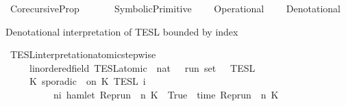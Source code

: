 %
\begin{isabellebody}%
%
%
\isadelimdocument
%
\endisadelimdocument
%
\isatagdocument
%
\isamarkuptrue%
%
\endisatagdocument
{\isafolddocument}%
%
\isadelimdocument
%
\endisadelimdocument
%
\isadelimtheory
%
\endisadelimtheory
%
\isatagtheory
{}\isamarkupfalse%
\ Corecursive{\isacharunderscore}Prop\isanewline
\ \ \isanewline
\ \ \ \ SymbolicPrimitive\isanewline
\ \ \ \ Operational\isanewline
\ \ \ \ Denotational\isanewline
\isanewline
{}%
\endisatagtheory
{\isafoldtheory}%
%
\isadelimtheory
%
\endisadelimtheory
%
\isadelimdocument
%
\endisadelimdocument
%
\isatagdocument
%
\isamarkuptrue%
%
\endisatagdocument
{\isafolddocument}%
%
\isadelimdocument
%
\endisadelimdocument
%
\begin{isamarkuptext}%
Denotational interpretation of TESL bounded by index%
\end{isamarkuptext}\isamarkuptrue%
\isamarkupfalse%
\ TESL{\isacharunderscore}interpretation{\isacharunderscore}atomic{\isacharunderscore}stepwise\isanewline
\ \ \ \ {\isacharcolon}{\isacharcolon}\ {\isacartoucheopen}{\isacharparenleft}{\isacharprime}{\isasymtau}{\isacharcolon}{\isacharcolon}linordered{\isacharunderscore}field{\isacharparenright}\ TESL{\isacharunderscore}atomic\ {\isasymRightarrow}\ nat\ {\isasymRightarrow}\ {\isacharprime}{\isasymtau}\ run\ set{\isacartoucheclose}\ {\isacharparenleft}{\isachardoublequoteopen}{\isasymlbrakk}\ {\isacharunderscore}\ {\isasymrbrakk}\isactrlsub T\isactrlsub E\isactrlsub S\isactrlsub L\isactrlbsup {\isasymge}\ {\isacharunderscore}\isactrlesup {\isachardoublequoteclose}{\isacharparenright}\ \isanewline
\ \ \ \ {\isacartoucheopen}{\isasymlbrakk}\ K\ sporadic\ {\isasymtau}\ on\ K\ {\isasymrbrakk}\isactrlsub T\isactrlsub E\isactrlsub S\isactrlsub L\isactrlbsup {\isasymge}\ i\isactrlesup \ {\isacharequal}\isanewline
\ \ \ \ \ \ \ \ {\isacharbraceleft}\ {\isasymrho}{\isachardot}\ {\isasymexists}n{\isasymge}i{\isachardot}\ hamlet\ {\isacharparenleft}{\isacharparenleft}Rep{\isacharunderscore}run\ {\isasymrho}{\isacharparenright}\ n\ K\ {\isacharequal}\ True\ {\isasymand}\ time\ {\isacharparenleft}{\isacharparenleft}Rep{\isacharunderscore}run\ {\isasymrho}{\isacharparenright}\ n\ K\ {\isacharequal}\ {\isasymtau}\ {\isacharbraceright}{\isacartoucheclose}\isanewline

\end{isabellebody}
